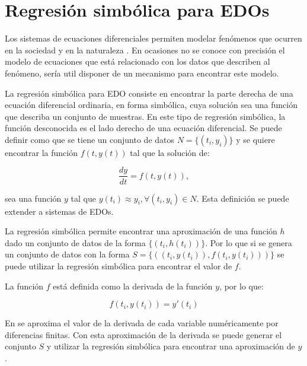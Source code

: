 \section{Regresión simbólica para EDOs}\label{section:symbolic_regression_in_does}

Los sistemas de ecuaciones diferenciales permiten modelar fenómenos que ocurren en la sociedad y en la naturaleza \cite{weiss2013sir, udrescu2020ai, kuddus2021mathematical}. En ocasiones no se conoce con precisión el modelo de ecuaciones que está relacionado con los datos que describen al fenómeno, sería util disponer de un mecanismo para encontrar este modelo.

La regresión simbólica para EDO consiste en encontrar la parte derecha de una ecuación diferencial ordinaria, en forma simbólica, cuya solución sea una función que describa un conjunto de muestras. En este tipo de regresión simbólica, la función desconocida es el lado derecho de una ecuación diferencial. Se puede definir como que se tiene un conjunto de datos $N = \{(t_i, y_i)\}$ y se quiere encontrar la función $f(t, y(t))$ tal que la solución de:

\begin{equation*}
    \frac{dy}{dt} = f(t, y(t)),
\end{equation*}

sea una función $y$ tal que $y(t_i) \approx y_i, \forall(t_i, y_i) \in N$. Esta definición se puede extender a sistemas de EDOs.

La regresión simbólica permite encontrar una aproximación de una función $h$ dado un conjunto de datos de la forma $\{(t_i, h(t_i))\}$. Por lo que si se genera un conjunto de datos con la forma $S = \{((t_i, y(t_i)), f(t_i, y(t_i)))\}$ se puede utilizar la regresión simbólica para encontrar el valor de $f$.

La función $f$ está definida como la derivada de la función $y$, por lo que:

$$f(t_i, y(t_i)) = y'(t_i)$$

En \cite{gaucel2014learning, iba2008inference,kronberger2019identification} se aproxima el valor de la derivada de cada variable numéricamente por diferencias finitas. Con esta aproximación de la derivada se puede generar el conjunto $S$ y utilizar la regresión simbólica para encontrar una aproximación de $y$.


